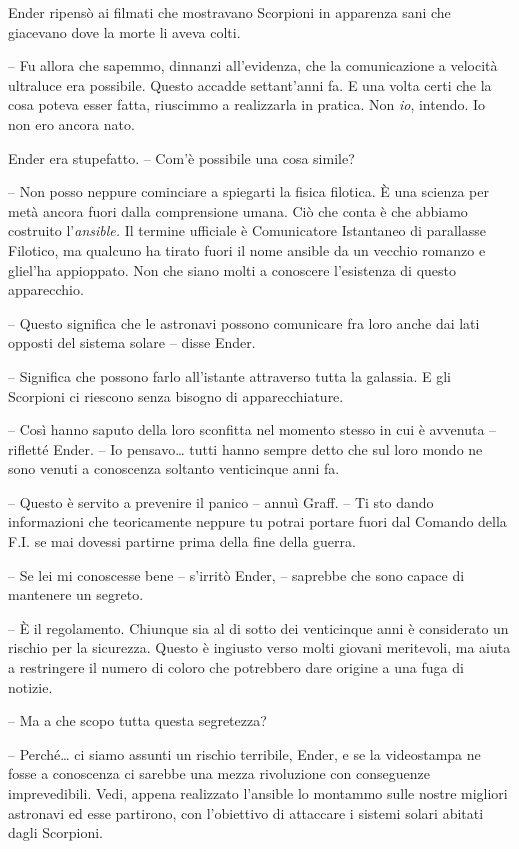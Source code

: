 {Ender ripensò ai filmati che mostravano Scorpioni in apparenza sani che
	giacevano dove la morte li aveva colti.}

{-- Fu allora che sapemmo, dinnanzi all'evidenza, che la comunicazione a
	velocità ultraluce era possibile. Questo accadde settant'anni fa. E una
	volta certi che la cosa poteva esser fatta, riuscimmo a realizzarla in
	pratica. Non \emph{io}, \emph{} intendo. Io non ero ancora nato.}

{Ender era stupefatto. -- Com'è possibile una cosa simile?}

{-- Non posso neppure cominciare a spiegarti la fisica filotica. È una
	scienza per metà ancora fuori dalla comprensione umana. Ciò che conta è
	che abbiamo costruito l'\emph{ansible.} Il termine ufficiale è
	Comunicatore Istantaneo di parallasse Filotico, ma qualcuno ha tirato
	fuori il nome ansible da un vecchio romanzo e gliel'ha appioppato. Non
	che siano molti a conoscere l'esistenza di questo apparecchio.}

{-- Questo significa che le astronavi possono comunicare fra loro anche
	dai lati opposti del sistema solare -- disse Ender.}

{-- Significa che possono farlo all'istante attraverso tutta la
	galassia. E gli Scorpioni ci riescono senza bisogno di apparecchiature.}

{-- Così hanno saputo della loro sconfitta nel momento stesso in cui è
	avvenuta -- rifletté Ender. -- Io pensavo\ldots{} tutti hanno sempre
	detto che sul loro mondo ne sono venuti a conoscenza soltanto
	venticinque anni fa.}

{-- Questo è servito a prevenire il panico -- annuì Graff. -- Ti sto
	dando informazioni che teoricamente neppure tu potrai portare fuori dal
	Comando della F.I. se mai dovessi partirne prima della fine della
	guerra.}

{-- Se lei mi conoscesse bene -- s'irritò Ender, -- saprebbe che sono
	capace di mantenere un segreto.}

{-- È il regolamento. Chiunque sia al di sotto dei venticinque anni è
	considerato un rischio per la sicurezza. Questo è ingiusto verso molti
	giovani meritevoli, ma aiuta a restringere il numero di coloro che
	potrebbero dare origine a una fuga di notizie.}

{-- Ma a che scopo tutta questa segretezza?}

{-- Perché\ldots{} ci siamo assunti un rischio terribile, Ender, e se la
	videostampa ne fosse a conoscenza ci sarebbe una mezza rivoluzione con
	conseguenze imprevedibili. Vedi, appena realizzato l'ansible lo montammo
	sulle nostre migliori astronavi ed esse partirono, con l'obiettivo di
	attaccare i sistemi solari abitati dagli Scorpioni.}

